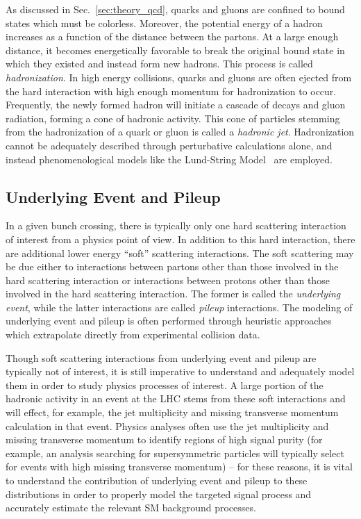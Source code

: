 As discussed in Sec.~\ref{sec:theory_qcd}, quarks and gluons are confined to bound states which must be colorless.
Moreover, the potential energy of a hadron increases as a function of the distance between the partons.
At a large enough distance, it becomes energetically favorable to break the original bound state in which they existed and instead form new hadrons.
This process is called \emph{hadronization}.
In high energy collisions, quarks and gluons are often ejected from the hard interaction with high enough momentum for hadronization to occur. 
Frequently, the newly formed hadron will initiate a cascade of decays and gluon radiation, forming a cone of hadronic activity.
This cone of particles stemming from the hadronization of a quark or gluon is called a \emph{hadronic jet}.
Hadronization cannot be adequately described through perturbative calculations alone, and instead phenomenological models like the Lund-String Model~\cite{Andersson:1983ia} are employed.

\subsection{Underlying Event and Pileup}
In a given bunch crossing, there is typically only one hard scattering interaction of interest from a physics point of view.
In addition to this hard interaction, there are additional lower energy ``soft'' scattering interactions.
The soft scattering may be due either to interactions between partons other than those involved in the hard scattering interaction or interactions between protons other than those involved in the hard scattering interaction.
The former is called the \emph{underlying event}, while the latter interactions are called \emph{pileup} interactions.
The modeling of underlying event and pileup is often performed through heuristic approaches which extrapolate directly from experimental collision data.

Though soft scattering interactions from underlying event and pileup are typically not of interest, it is still imperative to understand and adequately model them in order to study physics processes of interest.
A large portion of the hadronic activity in an event at the LHC stems from these soft interactions and will effect, for example, the jet multiplicity and missing transverse momentum calculation in that event.
Physics analyses often use the jet multiplicity and missing transverse momentum to identify regions of high signal purity (for example, an analysis searching for supersymmetric particles will typically select for events with high missing transverse momentum) -- for these reasons, it is vital to understand the contribution of underlying event and pileup to these distributions in order to properly model the targeted signal process and accurately estimate the relevant SM background processes.

